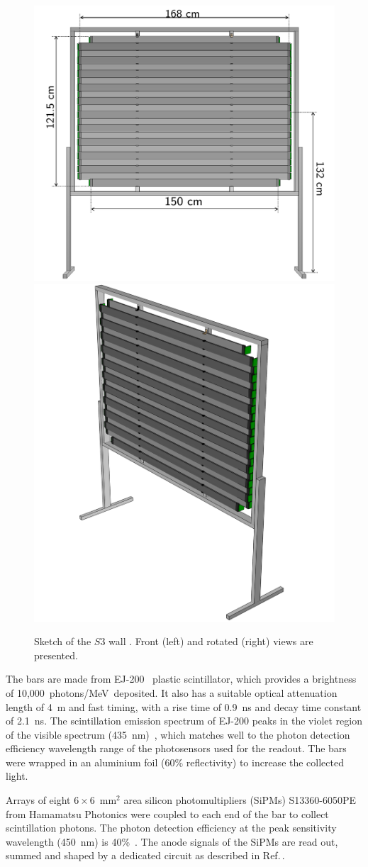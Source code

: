\begin{figure}
  \centering
  \includegraphics[width=0.54\linewidth]{files/Figures/uToF_sketch.pdf}
  \hfill
  \includegraphics[width=0.43\linewidth]{files/Figures/uTOF_rot.pdf}
  \caption{Sketch of the $\mathit{S3}$ wall \cite{S3-proceedings}.
  Front (left) and rotated (right) views are presented.}
  \label{fig:S3sketch}
\end{figure}

The bars are made from EJ-200~\cite{SCIONIX} plastic scintillator, which provides a brightness of 10,000~photons/MeV~deposited.
It also has a suitable optical attenuation length of 4~m and fast timing, with a rise time of 0.9~ns and decay time constant of 2.1~ns.
The scintillation emission spectrum of EJ-200 peaks in the violet region of the visible spectrum (435~nm)~\cite{EJ200}, which matches well to the photon detection efficiency wavelength range of the photosensors used for the readout.
The bars were wrapped in an aluminium foil (60\% reflectivity) to increase the collected light.

Arrays of eight $6 \times 6$~mm$^2$ area silicon photomultipliers (SiPMs) S13360-6050PE from Hamamatsu Photonics \cite{Hamamatsu} were coupled to each end of the bar to collect scintillation photons.
The photon detection efficiency at the peak sensitivity wavelength (450~nm) is 40\%~\cite{Hamamatsu}.
The anode signals of the SiPMs are read out, summed and shaped by a dedicated circuit as described in Ref.\,\cite{S3-readout}.

